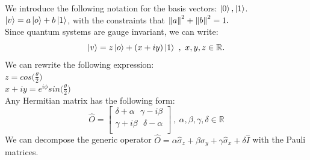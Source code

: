 \documentclass{article}
\begin{document}
We introduce the following notation for the basis vectors: $\ket{0}, \ket{1}$.
$\ket{v} = a\ket{o}+b\ket{1} $, with the constraints that $\norm{a}^2+\norm{b}^2=1.$\\
Since quantum systems are gauge invariant, we can write:
$$ \ket{v} = z\ket{o}+ (x+iy) \ket{1} \ , \ x,y,z \in \mathbb{R}.$$
We can rewrite the following expression: \\
$ z = cos \bigl( \frac{\theta}{2} \bigl) $\\
$ x +iy = e^{i\phi}sin\bigl( \frac{\theta}{2} \bigl)$
\\
Any Hermitian matrix has the following form:
$$\hat{O} = \begin{bmatrix}
    \delta +\alpha \ \ \  \gamma-i\beta \\
    \gamma + i\beta \ \ \  \delta - \alpha \\ 
\end{bmatrix} \ , \ \alpha,\beta,\gamma, \delta \in \mathbb{R}$$
We can decompose the generic operator $\hat{O} = \alpha \hat{\sigma}_z + \beta \hat{\sigma}_y + \gamma \hat{\sigma}_x + \delta \hat{I} $ with the Pauli matrices.
\end{document}
